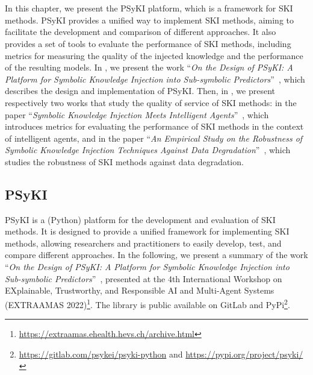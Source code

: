 
\chapter[Platform for symbolic knowledge injection]{}
\label{ch:psyki}
\minitoc

In this chapter, we present the \Gls{PSyKI} platform, which is a framework for \gls{SKI} methods.
%
\Gls{PSyKI} provides a unified way to implement \gls{SKI} methods, aiming to facilitate the development and comparison of different approaches.
%
It also provides a set of tools to evaluate the performance of \gls{SKI} methods, including metrics for measuring the quality of the injected knowledge and the performance of the resulting models.
%
In , we present the work ``\emph{On the Design of PSyKI: A Platform for Symbolic Knowledge Injection into Sub-symbolic Predictors}''~\cite{DBLP:conf/atal/MagniniCO22}, which describes the design and implementation of \gls{PSyKI}.
%
Then, in , we present respectively two works that study the quality of service of \gls{SKI} methods:
%
in  the paper ``\emph{Symbolic Knowledge Injection Meets Intelligent Agents}''~\cite{DBLP:journals/aamas/AgiolloRMCO23},
%
which introduces metrics for evaluating the performance of \gls{SKI} methods in the context of intelligent agents,
%
and in  the paper ``\emph{An Empirical Study on the Robustness of Symbolic Knowledge Injection Techniques Against Data Degradation}''~\cite{DBLP:conf/woa/RafanelliMACO24},
%
which studies the robustness of \gls{SKI} methods against data degradation.


\section{PSyKI}\label{sec:psyki}
%
\Gls{PSyKI} is a (Python) platform for the development and evaluation of \gls{SKI} methods.
%
It is designed to provide a unified framework for implementing \gls{SKI} methods, allowing researchers and practitioners to easily develop, test, and compare different approaches.
%
In the following, we present a summary of the work ``\emph{On the Design of PSyKI: A Platform for Symbolic Knowledge Injection into Sub-symbolic Predictors}''~\cite{DBLP:conf/atal/MagniniCO22}, presented at the 4th International Workshop on EXplainable, Trustworthy, and Responsible AI and Multi-Agent Systems (EXTRAAMAS 2022)\footnote{\url{https://extraamas.ehealth.hevs.ch/archive.html}}.
%
The library is public available on GitLab and PyPi\footnote{\url{https://gitlab.com/psykei/psyki-python} and \url{https://pypi.org/project/psyki/}}.


